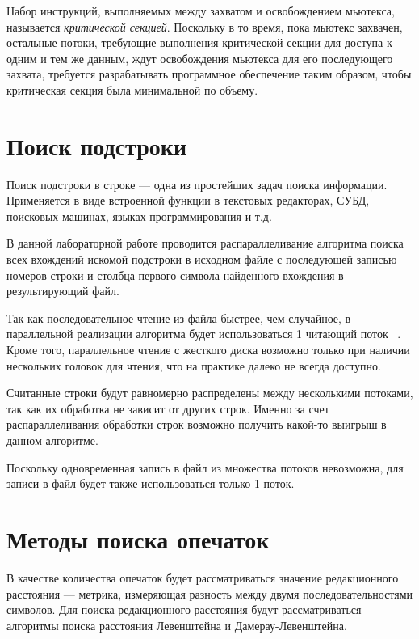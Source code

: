 Набор инструкций, выполняемых между захватом и освобождением мьютекса, называется \textit{критической секцией}.
Поскольку в то время, пока мьютекс захвачен, остальные потоки, требующие выполнения критической секции для доступа к одним и тем же данным, ждут освобождения мьютекса для его последующего захвата, требуется разрабатывать программное обеспечение таким образом, чтобы критическая секция была минимальной по объему.

\section{Поиск подстроки}
Поиск подстроки в строке — одна из простейших задач поиска информации.
Применяется в виде встроенной функции в текстовых редакторах, СУБД, поисковых машинах, языках программирования и т.д.

В данной лабораторной работе проводится распараллеливание алгоритма поиска всех вхождений искомой подстроки в исходном файле с последующей записью номеров строки и столбца первого символа найденного вхождения в результирующий файл.

Так как последовательное чтение из файла быстрее, чем случайное, в параллельной реализации алгоритма будет использоваться 1 читающий поток ~\cite{multithreading}.
Кроме того, параллельное чтение с жесткого диска возможно только при наличии нескольких головок для чтения, что на практике далеко не всегда доступно.

Считанные строки будут равномерно распределены между несколькими потоками, так как их обработка не зависит от других строк.
Именно за счет распараллеливания обработки строк возможно получить какой-то выигрыш в данном алгоритме.

Поскольку одновременная запись в файл из множества потоков невозможна, для записи в файл будет также использоваться только 1 поток.

\section{Методы поиска опечаток}

В качестве количества опечаток будет рассматриваться значение редакционного расстояния --- метрика, измеряющая разность между двумя последовательностями символов.
Для поиска редакционного расстояния будут рассматриваться алгоритмы поиска расстояния Левенштейна и Дамерау-Левенштейна.


